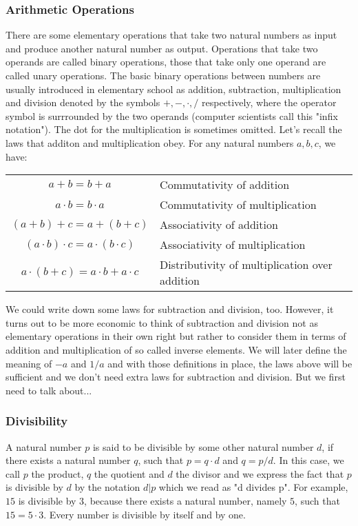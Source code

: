 \subsubsection{Arithmetic Operations}
There are some elementary operations that take two natural numbers as input and produce another natural number as output. Operations that take two operands are called binary operations, those that take only one operand are called unary operations. The basic binary operations between numbers are usually introduced in elementary school as addition, subtraction, multiplication and division denoted by the symbols $+,-,\cdot,/$ respectively, where the operator symbol is surrrounded by the two operands (computer scientists call this "infix notation"). The dot for the multiplication is sometimes omitted. Let's recall the laws that additon and multiplication obey. For any natural numbers $a,b,c$, we have:

\medskip
\begin{tabular}{c l}
  $a + b = b + a$                             & Commutativity of addition \\
  $a \cdot b = b \cdot a$                     & Commutativity of multiplication \\
  $(a + b) + c = a + (b + c)$                 & Associativity of addition \\
  $(a \cdot b) \cdot c = a \cdot (b \cdot c)$ & Associativity of multiplication \\
  $a \cdot (b + c) = a \cdot b + a \cdot c$   & Distributivity of multiplication over addition
\end{tabular}
\medskip

We could write down some laws for subtraction and division, too. However, it turns out to be more economic to think of subtraction and division not as elementary operations in their own right but rather to consider them in terms of addition and multiplication of so called inverse elements. We will later define the meaning of $-a$ and $1/a$ and with those definitions in place, the laws above will be sufficient and we don't need extra laws for subtraction and division. But we first need to talk about...

\subsubsection{Divisibility}
A natural number $p$ is said to be divisible by some other natural number $d$, if there exists a natural number $q$, such that $p = q \cdot d$ and $q = p/d$. In this case, we call $p$ the product, $q$ the quotient and $d$ the divisor and we express the fact that $p$ is divisible by $d$ by the notation $d | p$ which we read as "d divides p". For example, $15$ is divisible by $3$, because there exists a natural number, namely $5$, such that $15 = 5 \cdot 3$.
Every number is divisible by itself and by one.

